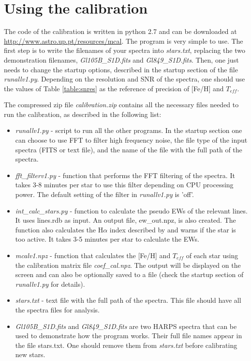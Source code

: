 \documentclass{aa}
\begin{document}
\appendix

\section{Using the calibration}

The code of the calibration is written in python 2.7 and can be downloaded at \url{http://www.astro.up.pt/resources/mcal}. The program is very simple to use. The first step is to write the filenames of your spectra into \textit{stars.txt}, replacing the two demonstration filenames, \textit{Gl105B\_S1D.fits} and \textit{Gl849\_S1D.fits}. Then, one just needs to change the startup options, described in the startup section of the file \textit{runallv1.py}. Depending on the resolution and SNR of the spectra, one should use the values of Table \ref{table:snres} as the reference of precision of [Fe/H] and $T_{eff}$.

The compressed zip file \textit{calibration.zip} contains all the necessary files needed to run the calibration, as described in the following list:
\begin{itemize}
\item \textit{runallv1.py} - script to run all the other programs. In the startup section one can choose to use FFT to filter high frequency noise, the file type of the input spectra (FITS or text file), and the name of the file with the full path of the spectra.
\item \textit{fft\_filterv1.py} - function that performs the FFT filtering of the spectra.  It takes 3-8 minutes per star to use this filter depending on CPU processing power. The default setting of the filter in \textit{runallv1.py} is 'off'.
\item \textit{int\_calc\_stars.py} - function to calculate the pseudo EWs of the relevant lines. It uses lines.rdb as input. An output file, ew\_out.npz, is also created. The function also calculates the H$\alpha$ index described by \citet{Gomes_da_Silva-2011} and warns if the star is too active. It takes 3-5 minutes per star to calculate the EWs.
\item \textit{mcalv1.npz} - function that calculates the [Fe/H] and $T_{eff}$ of each star using the calibration matrix file \textit{coef\_cal.npz}. The output will be displayed on the screen and can also be optionally saved to a file (check the startup section of \textit{runallv1.py} for details). 
\item \textit{stars.txt} - text file with the full path of the spectra. This file should have all the spectra files for analysis.
\item \textit{Gl105B\_S1D.fits} and \textit{Gl849\_S1D.fits} are two HARPS spectra that can be used to demonstrate how the program works. Their full file names appear in the file stars.txt. One should remove them from \textit{stars.txt} before calibrating new stars.
\end{itemize}







\end{document}
